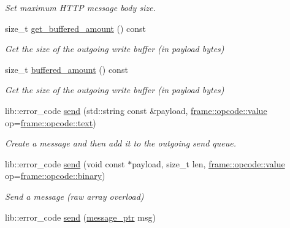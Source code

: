 \begin{DoxyCompactItemize}
\begin{DoxyCompactList}\small\item\em Set maximum H\+T\+T\+P message body size. \end{DoxyCompactList}\item 
size\+\_\+t \hyperlink{classwebsocketpp_1_1connection_a27f8c2f8d9d84aa68891593d48495bd2}{get\+\_\+buffered\+\_\+amount} () const 
\begin{DoxyCompactList}\small\item\em Get the size of the outgoing write buffer (in payload bytes) \end{DoxyCompactList}\item 
size\+\_\+t \hyperlink{classwebsocketpp_1_1connection_acb2fc5317ce219d92425635c1b2bde53}{buffered\+\_\+amount} () const 
\begin{DoxyCompactList}\small\item\em Get the size of the outgoing write buffer (in payload bytes) \end{DoxyCompactList}\item 
lib\+::error\+\_\+code \hyperlink{classwebsocketpp_1_1connection_af3f96a962ed7a271a00e85ba4df2db45}{send} (std\+::string const \&payload, \hyperlink{namespacewebsocketpp_1_1frame_1_1opcode_ae68711643096dfc4af6d66ade3f9fd5e}{frame\+::opcode\+::value} op=\hyperlink{namespacewebsocketpp_1_1frame_1_1opcode_ae68711643096dfc4af6d66ade3f9fd5ea6b65f28626b19b2eef447744c564e727}{frame\+::opcode\+::text})
\begin{DoxyCompactList}\small\item\em Create a message and then add it to the outgoing send queue. \end{DoxyCompactList}\item 
lib\+::error\+\_\+code \hyperlink{classwebsocketpp_1_1connection_a607fc1d40a2cf994ccc7173a94a2774d}{send} (void const $\ast$payload, size\+\_\+t len, \hyperlink{namespacewebsocketpp_1_1frame_1_1opcode_ae68711643096dfc4af6d66ade3f9fd5e}{frame\+::opcode\+::value} op=\hyperlink{namespacewebsocketpp_1_1frame_1_1opcode_ae68711643096dfc4af6d66ade3f9fd5eabe7c19fe7e9744d6a0f041e4c99f120f}{frame\+::opcode\+::binary})
\begin{DoxyCompactList}\small\item\em Send a message (raw array overload) \end{DoxyCompactList}\item 
lib\+::error\+\_\+code \hyperlink{classwebsocketpp_1_1connection_a29900da403dbafab8095c0989104be90}{send} (\hyperlink{classwebsocketpp_1_1connection_a3b98c091caf54540024538d2394ffb57}{message\+\_\+ptr} msg)

\end{DoxyCompactItemize}
